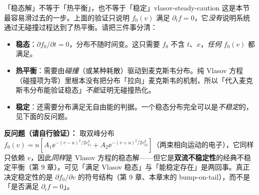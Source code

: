 \begin{warning}{「稳态解」不等于「热平衡」，也不等于「稳定」}{vlasov-steady-caution}
这是本节最容易滑过去的一步。上面的验证只说明 $f_0(v)$ 满足 $\partial_tf=0$，它\emph{没有}说明系统通过无碰撞过程达到了热平衡。请把三件事分清：
\begin{itemize}
\item \textbf{稳态}：$\partial f_0/\partial t=0$，分布不随时间变。这只需要 $f_0$ 不含 $t$、$x$，\emph{任何} $f_0(v)$ 都满足。
\item \textbf{热平衡}：需要由\emph{碰撞}（或某种耗散）驱动到麦克斯韦分布。纯 Vlasov 方程（碰撞项为零）里根本没有把分布「拉向」麦克斯韦的机制，所以「代入麦克斯韦分布能验证稳态」\emph{不能}证明无碰撞热化。
\item \textbf{稳定}：还需要分布满足无自由能的判据。一个稳态分布完全可以是\emph{不稳定}的，见下面的反问题。
\end{itemize}

\textbf{反问题（请自行验证）：} 取双峰分布 $f_0(v)=n[A_1\ee^{-(v-u)^2/2v_{t1}^2}+A_2\ee^{-(v+u)^2/2v_{t2}^2}]$（两束相向运动的电子），它同样只依赖 $v$，因此\emph{同样}是 Vlasov 方程的稳态解——但它是\textbf{双流不稳定性}的经典不稳定平衡（第 9 章）。可见「满足 Vlasov 稳态」与「能稳定存在」是两回事。真正决定稳定性的是 $\partial f_0/\partial v$ 的符号结构（第 9 章、本章末的 bump-on-tail），而不是「是否满足 $\partial_tf=0$」。
\end{warning}

